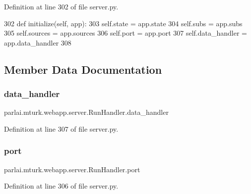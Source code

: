 Definition at line 302 of file server.\+py.


\begin{DoxyCode}
302     \textcolor{keyword}{def }initialize(self, app):
303         self.state = app.state
304         self.subs = app.subs
305         self.sources = app.sources
306         self.port = app.port
307         self.data\_handler = app.data\_handler
308 
\end{DoxyCode}


\subsection{Member Data Documentation}
\mbox{\label{classparlai_1_1mturk_1_1webapp_1_1server_1_1RunHandler_a55ebe293c2c36001b28f879a256fb03d}} 
\subsubsection{\texorpdfstring{data\+\_\+handler}{data\_handler}}
{\footnotesize\ttfamily parlai.\+mturk.\+webapp.\+server.\+Run\+Handler.\+data\+\_\+handler}



Definition at line 307 of file server.\+py.

\mbox{\label{classparlai_1_1mturk_1_1webapp_1_1server_1_1RunHandler_a18313aaf7e807891e1d21b0930639ca9}} 
\subsubsection{\texorpdfstring{port}{port}}
{\footnotesize\ttfamily parlai.\+mturk.\+webapp.\+server.\+Run\+Handler.\+port}



Definition at line 306 of file server.\+py.

